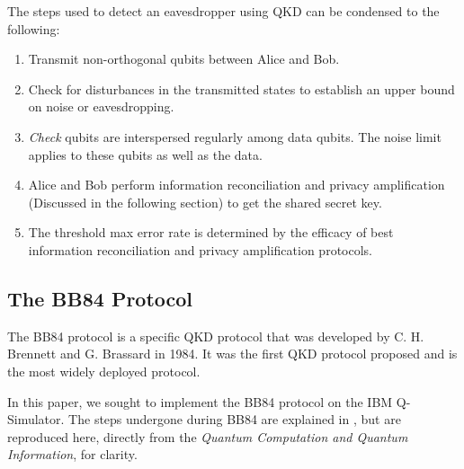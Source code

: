 \documentclass[12]{amsart}
\begin{document}
The steps used to detect an eavesdropper using QKD can be condensed to the following\cite{text}:

\begin{enumerate}
\item Transmit non-orthogonal qubits between Alice and Bob. 
\item Check for disturbances in the transmitted states to establish an upper bound on noise or eavesdropping.
\item \textit{Check} qubits are interspersed regularly among data qubits. The noise limit applies to these qubits as well as the data. 
\item Alice and Bob perform information reconciliation and privacy amplification (Discussed in the following section) to get the shared secret key.
\item The threshold max error rate is determined by the efficacy of best information reconciliation and privacy amplification protocols.

\end{enumerate}

\subsection{The BB84 Protocol}\label{bb84}

The BB84 protocol is a specific QKD protocol that was developed by C. H. Brennett and G. Brassard in 1984\cite{bb84}. It was the first QKD protocol proposed and is the most widely deployed protocol\cite{sat}\cite{bb84}.

In this paper, we sought to implement the BB84 protocol on the IBM Q-Simulator. The steps undergone during BB84 are explained in \cite{text}, but are reproduced here, directly from the \textit{Quantum Computation and Quantum Information}, for clarity. 
\end{document}
